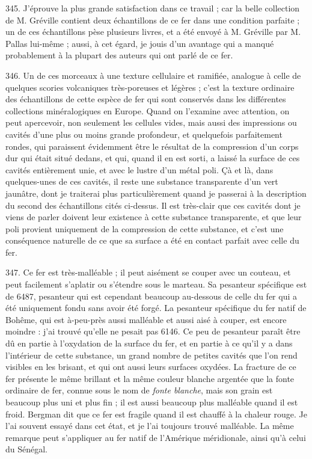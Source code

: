 \documentclass[a4paper, 11pt, oneside, polutonikogreek, french]{article}
\begin{document}
345. J'éprouve la plus grande satisfaction dans ce travail ; car la belle collection de M. Gréville contient deux échantillons de ce fer dans une condition parfaite ; un de ces échantillons pèse plusieurs livres, et a été envoyé à M. Gréville par M. Pallas lui-même ; aussi, à cet égard, je jouis d'un avantage qui a manqué probablement à la plupart des auteurs qui ont parlé de ce fer.

346. Un de ces morceaux à une texture cellulaire et ramifiée, analogue à celle de quelques scories volcaniques très-poreuses et légères ; c'est la texture ordinaire des échantillons de cette espèce de fer qui sont conservés dans les différentes collections minéralogiques en Europe. Quand on l'examine avec attention, on peut apercevoir, non seulement les cellules vides, mais aussi des impressions ou cavités d'une plus ou moins grande profondeur, et quelquefois parfaitement rondes, qui paraissent évidemment être le résultat de la compression d'un corps dur qui était situé dedans, et qui, quand il en est sorti, a laissé la surface de ces cavités entièrement unie, et avec le lustre d'un métal poli. Çà et là, dans quelques-unes de ces cavités, il reste une substance transparente d'un vert jaunâtre, dont je traiterai plus particulièrement quand je passerai à la description du second des échantillons cités ci-dessus. Il est très-clair que ces cavités dont je viens de parler doivent leur existence à cette substance transparente, et que leur poli provient uniquement de la compression de cette substance, et c'est une conséquence naturelle de ce que sa surface a été en contact parfait avec celle du fer.

347. Ce fer est très-malléable ; il peut aisément se couper avec un couteau, et peut facilement s'aplatir ou s'étendre sous le marteau. Sa pesanteur spécifique est de 6487, pesanteur qui est cependant beaucoup au-dessous de celle du fer qui a été uniquement fondu sans avoir été forgé. La pesanteur spécifique du fer natif de Bohême, qui est à-peu-près aussi malléable et aussi aisé à couper, est encore moindre : j'ai trouvé qu'elle ne pesait pas 6146. Ce peu de pesanteur paraît être dû en partie à l'oxydation de la surface du fer, et en partie à ce qu'il y a dans l'intérieur de cette substance, un grand nombre de petites cavités que l'on rend visibles en les brisant, et qui ont aussi leurs surfaces oxydées. La fracture de ce fer présente le même brillant et la même couleur blanche argentée que la fonte ordinaire de fer, connue sous le nom de \emph{fonte blanche}, mais son grain est beaucoup plus uni et plus fin ; il est aussi beaucoup plus malléable quand il est froid. Bergman dit que ce fer est fragile quand il est chauffé à la chaleur rouge. Je l'ai souvent essayé dans cet état, et je l'ai toujours trouvé malléable. La même remarque peut s'appliquer au fer natif de l'Amérique méridionale, ainsi qu'à celui du Sénégal.
\end{document}
